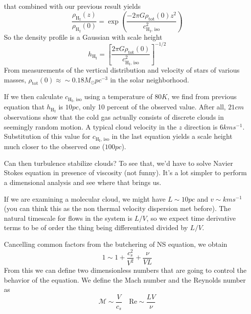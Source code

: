 that combined with our previous result yields
\begin{equation*}
    \frac{\rho_{\text{H}_{\text{I}}}(z)}{\rho_{\text{H}_{\text{I}}}(0)} = \exp\left(\frac{-2\pi G \rho_{\text{tot}}(0)z^{2}}{c_{\text{H}_{\text{I}}, \,\text{iso}}^{2}}\right)
\end{equation*}
So the density profile is a Gaussian with scale height
\begin{equation*}
    h_{\text{H}_{\text{I}}} = \left[\frac{2\pi G \rho_{\text{tot}}(0)}{c_{\text{H}_{\text{I}}, \,\text{iso}}^{2}}\right]^{-1/2}
\end{equation*}
From measurements of the vertical distribution and velocity of stars of various masses, $\rho_{\text{tot}}(0)\approx \sim 0.18M_{\odot}\unit{pc}^{-3}$ in the solar neighborhood.
\par If we then calculate $c_{\text{H}_{\text{I}}, \,\text{iso}}$ using a temperature of $80\unit{K}$, we find from previous equation that $h_{\text{H}_{\text{I}}}$ is $10\unit{pc}$, only 10 percent of the observed value. After all, $21\unit{cm}$ observations show that the cold gas actually consists of discrete clouds in seemingly random motion. A typical cloud velocity in the $z$ direction is $6\unit{km}\unit{s}^{-1}$. Substitution of this value for $c_{\text{H}_{\text{I}}, \,\text{iso}}$ in the last equation yields a scale height much closer to the observed one ($100\unit{pc}$).
\par Can then turbulence stabilize clouds? To see that, we'd have to solve Navier Stokes equation in presence of viscosity (not funny). It's a lot simpler to perform a dimensional analysis and see where that brings us.
\par If we are examining a molecular cloud, we might have $L \sim 10\unit{pc}$ and $v\sim\unit{km}\unit{s}^{-1}$ (you can think this as the non thermal velocity dispersion met before). The natural timescale for flows in the system is $L/V$, so we expect time derivative terms to be of order the thing being differentiated divided by $L/V$.
\par Cancelling common factors from the butchering of NS equation, we obtain
\begin{equation*}
    1 \sim 1 +\frac{c_{s}^{2}}{V^{2}}+\frac{\nu}{VL}
\end{equation*}
From this we can define two dimensionless numbers that are going to control the behavior of the equation. We define the Mach number and the Reynolds number as
\begin{equation*}
    \mathcal{M} \sim \frac{V}{c_{s}} \quad  \text{Re} \sim \frac{LV}{\nu}
\end{equation*}
